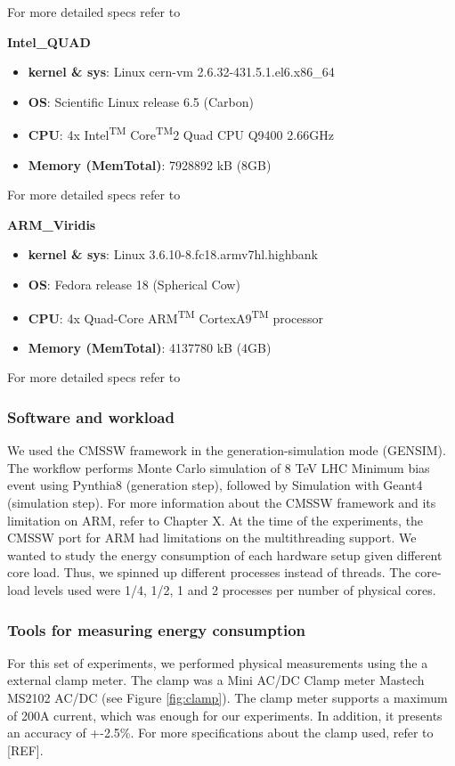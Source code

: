 For more detailed specs refer to \cite{atom_specs}

\vspace{10mm}
\textbf{Intel\_QUAD}
\begin{itemize}
  \item[] \textbf{kernel \& sys}:  Linux cern-vm 2.6.32-431.5.1.el6.x86\_64
  \item[] \textbf{OS}: Scientific Linux release 6.5 (Carbon)
  \item[] \textbf{CPU}:    4x Intel\textsuperscript{TM} Core\textsuperscript{TM}2 Quad CPU  Q9400  \@ 2.66GHz
  \item[] \textbf{Memory  (MemTotal)}:        7928892 kB (8GB)
\end{itemize}

For more detailed specs refer to \cite{quad_specs}

\vspace{10mm}
\textbf{ARM\_Viridis}
\begin{itemize}
  \item[] \textbf{kernel \& sys}:  Linux  3.6.10-8.fc18.armv7hl.highbank
  \item[] \textbf{OS}: Fedora release 18 (Spherical Cow)
  \item[] \textbf{CPU}:    4x Quad-Core ARM\textsuperscript{TM} CortexA9\textsuperscript{TM} processor
  \item[] \textbf{Memory  (MemTotal)}:        4137780 kB (4GB) 
\end{itemize}

For more detailed specs refer to \cite{viridis_specs}


\subsubsection*{Software and workload}
We used the CMSSW framework in the generation-simulation mode (GEN\-SIM). The workflow performs Monte Carlo simulation of 8 TeV LHC Minimum bias event using Pynthia8 (generation step), followed by Simulation with Geant4 (simulation step). For more information about the CMSSW framework and its limitation on ARM, refer to Chapter X.
At the time of the experiments, the CMSSW port for ARM had limitations on the multithreading support. We wanted to study the energy consumption of each hardware setup given different core load. Thus, we spinned up different processes instead of threads. The core-load levels used were 1/4, 1/2, 1 and 2 processes per number of physical cores. 

\subsubsection*{Tools for measuring energy consumption}
For this set of experiments, we performed physical measurements using the a external clamp meter. The clamp was a Mini AC/DC Clamp meter
Mastech MS2102 AC/DC (see Figure \ref{fig:clamp}). The clamp meter supports a maximum of 200A current, which was enough for our experiments. In addition, it presents an accuracy of +-2.5\%. For more specifications about the clamp used, refer to [REF].

